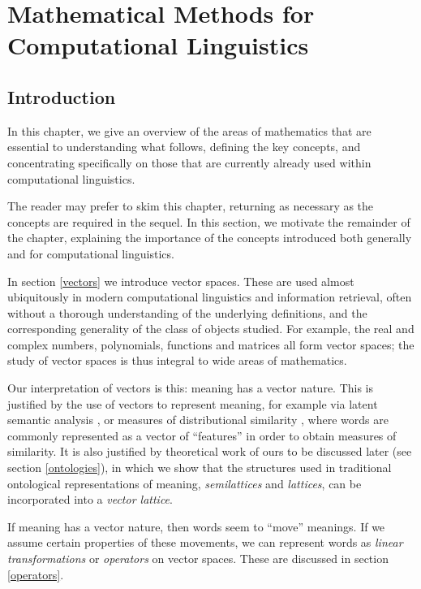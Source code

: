 

% 
 

 \chapter{Mathematical Methods for Computational Linguistics}
 \section{Introduction}
 
In this chapter, we give an overview of the areas of mathematics that are essential to understanding what follows, defining the key concepts, and concentrating specifically on those that are currently already used within computational linguistics.
 
The reader may prefer to skim this chapter, returning as necessary as the concepts are required in the sequel. In this section, we motivate the remainder of the chapter, explaining the importance of the concepts introduced both generally and for computational linguistics.

In section \ref{vectors} we introduce vector spaces. These are used almost ubiquitously in modern computational linguistics and information retrieval, often without a thorough understanding of the underlying definitions, and the corresponding generality of the class of objects studied. For example, the real and complex numbers, polynomials, functions and matrices all form vector spaces; the study of vector spaces is thus integral to wide areas of mathematics.

Our interpretation of vectors is this: meaning has a vector nature. This is justified by the use of vectors to represent meaning, for example via latent semantic analysis \cite{Deerwester:90}, or measures of distributional similarity \cite{Lee}, where words are commonly represented as a vector of ``features'' in order to obtain measures of similarity. It is also justified by theoretical work of ours to be discussed later (see section \ref{ontologies}), in which we show that the structures used in traditional ontological representations of meaning, \emph{semilattices} and \emph{lattices}, can be incorporated into a \emph{vector lattice}.

If meaning has a vector nature, then words seem to ``move'' meanings. If we assume certain properties of these movements, we can represent words as \emph{linear transformations} or \emph{operators} on vector spaces. These are discussed in section \ref{operators}.

